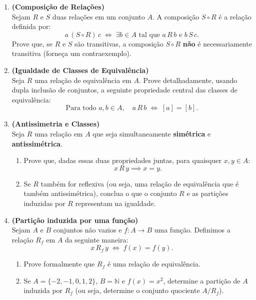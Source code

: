 \documentclass[12pt]{article}
\begin{document}
\begin{enumerate}
\vspace{0.3cm}
\item \textbf{(Composição de Relações)}\\
Sejam $R$ e $S$ duas relações em um conjunto $A$. A composição $S \circ R$ é a relação definida por:
\[
a\,(S \circ R)\,c \;\Longleftrightarrow\; \exists b \in A \text{ tal que } a\,R\,b \text{ e } b\,S\,c.
\]
Prove que, se $R$ e $S$ são transitivas, a composição $S \circ R$ \textbf{não} é necessariamente transitiva (forneça um contraexemplo).

\vspace{0.3cm}
\item \textbf{(Igualdade de Classes de Equivalência)}\\
Seja $R$ uma relação de equivalência em $A$. Prove detalhadamente, usando dupla inclusão de conjuntos, a seguinte propriedade central das classes de equivalência:
\[
\text{Para todo } a, b \in A, \quad a\,R\,b \;\Longleftrightarrow\; [a] = [b].
\]

\vspace{0.3cm}
\item \textbf{(Antissimetria e Classes)}\\
Seja $R$ uma relação em $A$ que seja simultaneamente \textbf{simétrica} e \textbf{antissimétrica}. 
\begin{enumerate}[label=\alph*)]
    \item Prove que, dadas essas duas propriedades juntas, para quaisquer $x,y \in A$: 
    \[ x\,R\,y \implies x = y. \]
    \item Se $R$ também for reflexiva (ou seja, uma relação de equivalência que é também antissimétrica), conclua o que o conjunto $R$ e as partições induzidas por $R$ representam na igualdade.
\end{enumerate}

\vspace{0.3cm}
\item \textbf{(Partição induzida por uma função)}\\
Sejam $A$ e $B$ conjuntos não vazios e $f: A \to B$ uma função. Definimos a relação $R_f$ em $A$ da seguinte maneira:
\[
x\,R_f\,y \;\Longleftrightarrow\; f(x) = f(y).
\]
\begin{enumerate}[label=\alph*)]
    \item Prove formalmente que $R_f$ é uma relação de equivalência.
    \item Se $A = \{-2, -1, 0, 1, 2\}$, $B = \mathbb{N}$ e $f(x) = x^2$, determine a partição de $A$ induzida por $R_f$ (ou seja, determine o conjunto quociente $A / R_f$).
\end{enumerate}


\end{enumerate}
\end{document}
